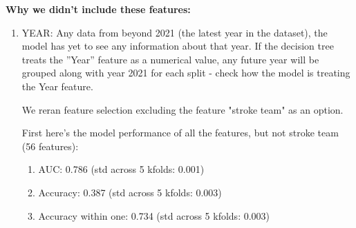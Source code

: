 \textbf{Why we didn't include these features:}
\begin{enumerate}
    \item YEAR: Any data from beyond 2021 (the latest year in the dataset), the model has yet to see any information about that year. If the decision tree treats the ”Year” feature as a numerical value, any future year will be grouped along with year 2021 for each split - check how the model is treating the Year feature.
    
    We reran feature selection excluding the feature "stroke team" as an option. 
    
    First here's the model performance of all the features, but not stroke team (56 features):
    \begin{enumerate}
        \item AUC: 0.786 (std across 5 kfolds: 0.001)
        \item Accuracy: 0.387 (std across 5 kfolds: 0.003)
        \item Accuracy within one: 0.734 (std across 5 kfolds: 0.003)
   \end{enumerate}

    
    

\end{enumerate}
